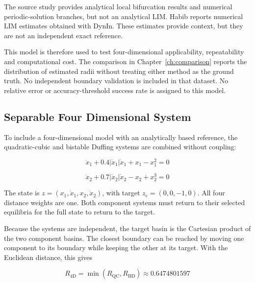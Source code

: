 The source study \cite{ref15} provides analytical local bifurcation results and numerical periodic-solution branches, but not an analytical LIM. Habib \cite[Figures 7--8]{ref12} reports numerical LIM estimates obtained with DynIn. These estimates provide context, but they are not an independent exact reference.

\begin{revision}
This model is therefore used to test four-dimensional applicability, repeatability and computational cost. The comparison in Chapter~\ref{ch:comparison} reports the distribution of estimated radii without treating either method as the ground truth. No independent boundary validation is included in that dataset. No relative error or accuracy-threshold success rate is assigned to this model.
\end{revision}

\subsection{Separable Four Dimensional System}

\begin{revision}
To include a four-dimensional model with an analytically based reference, the quadratic-cubic and bistable Duffing systems are combined without coupling:
\end{revision}

\begin{equation}
  {\ddot{x}}_{1} + 0.4|{\dot{x}}_{1}|{\dot{x}}_{1} + {x}_{1} - {x}_{1}^{2} = 0
\end{equation}

\begin{equation}
  {\ddot{x}}_{2} + 0.7|{\dot{x}}_{2}|{\dot{x}}_{2} - {x}_{2} + {x}_{2}^{3} = 0
\end{equation}

The state is $z=({x}_{1},{\dot{x}}_{1},{x}_{2},{\dot{x}}_{2})$, with target ${z}_{e}=(0,0,-1,0)$. All four distance weights are one. Both component systems must return to their selected equilibria for the full state to return to the target.

Because the systems are independent, the target basin is the Cartesian product of the two component basins. The closest boundary can be reached by moving one component to its boundary while keeping the other at its target. With the Euclidean distance, this gives

\begin{equation}
  {R}_{\mathrm{4D}} = \min({R}_{\mathrm{QC}},{R}_{\mathrm{BD}}) \approx  0.6474801597
\end{equation}

